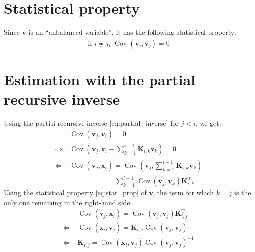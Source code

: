 \documentclass[12pt]{article}
\DeclareMathOperator{\Cov}{Cov}
\begin{document}
\section{Statistical property}
Since $\mathbf{v}$ is an ``unbalanced variable'', it has the following statistical property:
\begin{align}
\label{eq:stat_prop}
\text{if } i \ne j \text{, }\Cov\left(\mathbf{v}_i,\mathbf{v}_j\right) = 0
\end{align}

\section{Estimation with the partial recursive inverse}
Using the partial recursive inverse \eqref{eq:partial_inverse} for $j < i$, we get:
\begin{align}
&\Cov\left(\mathbf{v}_j,\mathbf{v}_i\right) = 0 \\
\Leftrightarrow \ &\Cov\left(\mathbf{v}_j,\mathbf{x}_i - \sum_{k=1}^{i-1} \mathbf{K}_{i,k} \mathbf{v}_k\right) = 0 \\
\Leftrightarrow \ &\Cov\left(\mathbf{v}_j,\mathbf{x}_i\right) =\Cov\left(\mathbf{v}_j,\sum_{k=1}^{i-1} \mathbf{K}_{i,k} \mathbf{v}_k\right) \\
& \qquad \qquad \quad \ = \sum_{k=1}^{i-1}\Cov\left(\mathbf{v}_j,\mathbf{v}_k\right) \mathbf{K}_{i,k}^\mathrm{T}
\end{align}
Using the statistical property \eqref{eq:stat_prop} of $\mathbf{v}$, the term for which $k=j$ is the only one remaining in the right-hand side:
\begin{align}
\label{eq:partial_K}
&\Cov\left(\mathbf{v}_j,\mathbf{x}_i\right) =\Cov\left(\mathbf{v}_j,\mathbf{v}_j\right) \mathbf{K}_{i,j}^\mathrm{T} \nonumber \\
\Leftrightarrow \ &\Cov\left(\mathbf{x}_i,\mathbf{v}_j\right) = \mathbf{K}_{i,j}\Cov\left(\mathbf{v}_j,\mathbf{v}_j\right) \nonumber \\
\Leftrightarrow \ & \mathbf{K}_{i,j} = \Cov\left(\mathbf{x}_i,\mathbf{v}_j\right)\Cov\left(\mathbf{v}_j,\mathbf{v}_j\right)^{-1}
\end{align}
\end{document}
